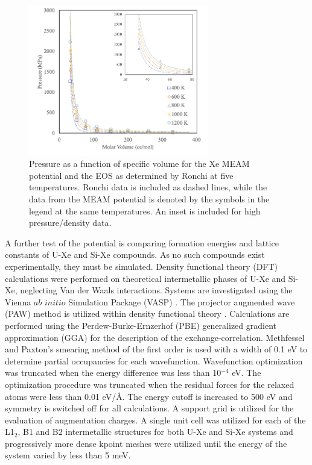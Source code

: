\documentclass[review]{elsarticle}
\begin{document}
\begin{figure}[hbt]
	\centering
	\includegraphics[width=0.7\textwidth]{Xe_T_PvsV.png}
 \caption{Pressure as a function of specific volume for the Xe MEAM potential and the EOS as determined by Ronchi \cite{ronchi1981} at five temperatures. Ronchi data is included as dashed lines, while the data from the MEAM potential is denoted by the symbols in the legend at the same temperatures. An inset is included for high pressure/density data.}\label{fig:xe_eos}
\end{figure}

\FloatBarrier

A further test of the potential is comparing formation energies and lattice constants of U-Xe and Si-Xe compounds. As no such compounds exist experimentally, they must be simulated. Density functional theory (DFT) calculations were performed on theoretical intermetallic phases of U-Xe and Si-Xe, neglecting Van der Waals interactions. Systems are investigated using the Vienna $\textit{ab initio}$ Simulation Package (VASP) \cite{vasp1, vasp2, vasp3, vasp4}. The projector augmented wave (PAW) method \cite{paw1, paw2} is utilized within density functional theory \cite{dft1, dft2}. Calculations are performed using the Perdew-Burke-Ernzerhof (PBE) \cite{pbe1, pbe2} generalized gradient approximation (GGA) for the description of the exchange-correlation. Methfessel and Paxton's smearing method \cite{methfessel} of the first order is used with a width of 0.1 eV to determine partial occupancies for each wavefunction. Wavefunction optimization was truncated when the energy difference was less than 10$^{-4}$ eV. The optimization procedure was truncated when the residual forces for the relaxed atoms were less than 0.01 eV/{\AA}. The energy cutoff is increased to 500 eV and symmetry is switched off for all calculations. A support grid is utilized for the evaluation of augmentation charges. A single unit cell was utilized for each of the L1$_2$, B1 and B2 intermetallic structures for both U-Xe and Si-Xe systems and progressively more dense kpoint meshes were utilized until the energy of the system varied by less than 5 meV. 
\end{document}
